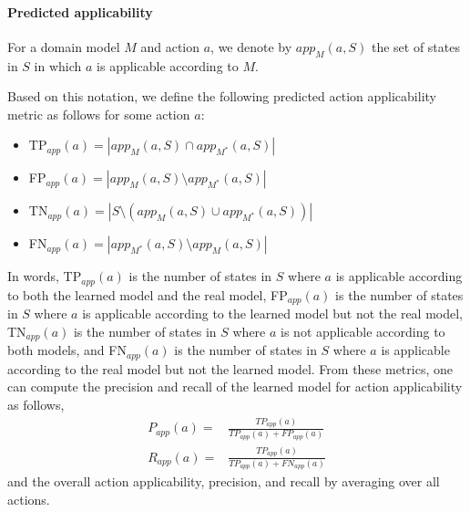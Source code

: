 \documentclass{article}
\theoremstyle{definition}
\theoremstyle{remark}
\newcommand{\realm}{{\ensuremath{M^*}}\xspace}
\newcommand{\app}{\ensuremath{\textit{app}}\xspace}
\newif\ifaddcomments
\newcommand{\roni}[1]{\ifaddcomments{\textcolor{red}{[Roni: #1]}}\fi}
\newcommand{\gregor}[1]{\ifaddcomments{\textcolor{orange}{[Gregor: #1]}}\fi}
\newcommand{\leo}[1]{\ifaddcomments{\textcolor{pink}{[Leonardo: #1]}}\fi}
\begin{document}
\paragraph{Predicted applicability}
For a domain model $M$ and action $a$, we denote by $\app_M(a,S)$ the set of states in $S$ in which $a$ is applicable according to $M$. \gregor{This is easy to compute for STRIPS/SAS+, but hard if you have things like disjunctive preconditions. It should be \#P-hard}
\roni{Hmm. I don't see what this is not linear in the size of $S$ and the preconditions of $a$ in $M$: we iterate over every state in $S$ and then check whether $a$ is applicable in it according to $M$. I guess if we have some universals in the preconditions this might be harder?}
Based on this notation, we define the following predicted action applicability metric as follows for some action $a$:
\begin{itemize}
    \item TP$_{\app}(a)=|\app_M(a,S)\cap \app_\realm(a,S)|$
    \item FP$_{\app}(a)=|\app_M(a,S)\setminus \app_\realm(a,S)|$ 
    \item TN$_{\app}(a)=|S\setminus (\app_M(a,S)\cup \app_\realm(a,S))|$
    \item FN$_{\app}(a)=|\app_\realm(a,S)\setminus \app_M(a,S)|$
\end{itemize}
\leo{Should we keep TN? (since is not mentioned in precision/recall), similarly for predicted effects}
\gregor{Hm. That is strange. Should we also define precision and recall for the negative class? Does that make sense? This would be how good the approach is to determine non-applicable actions. I.e.:
\begin{align}
    P_{\app}^-(a)= & \frac{TN_{\app}(a)}{TN_{\app}(a)+FN_{\app}(a)}\\
    R_{\app}^-(a)= & \frac{TN_{\app}(a)}{TN_{\app}(a)+FP_{\app}(a)}    
\end{align} 
}
\leo{I am not sure since it's binary classification. I think precision/recall for the negative class is dual w.r.t. the positive class ones}
In words, TP$_{\app}(a)$ is the number of states in $S$ where $a$ is applicable according to both the learned model and the real model, FP$_{\app}(a)$ is the number of states in $S$ where $a$ is applicable according to the learned model but not the real model, TN$_{\app}(a)$ is the number of states in $S$ where $a$ is not applicable according to both models, and FN$_{\app}(a)$ is the number of states in $S$ where $a$ is applicable according to the real model but not the learned model. 
From these metrics, one can compute the precision and recall of the learned model for action applicability as follows,
\begin{align}
    P_{\app}(a)= & \frac{TP_{\app}(a)}{TP_{\app}(a)+FP_{\app}(a)}\\
    R_{\app}(a)= & \frac{TP_{\app}(a)}{TP_{\app}(a)+FN_{\app}(a)}    
\end{align} 
and the overall action applicability, precision, and recall
by averaging over all actions.  
\end{document}
